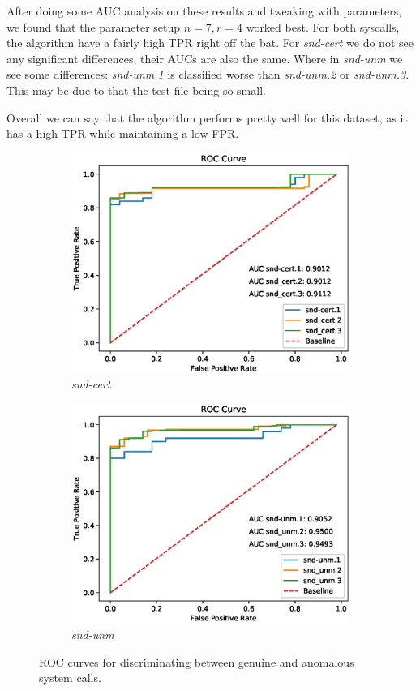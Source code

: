 \documentclass[11pt]{article}
\begin{document}
After doing some AUC analysis on these results and tweaking with parameters, we found that the parameter setup $n=7, r=4$ worked best. For both syscalls, the algorithm have a fairly high TPR right off the bat. For \textit{snd-cert} we do not see any significant differences, their AUCs are also the same. Where in \textit{snd-unm} we see some differences: \textit{snd-unm.1} is classified worse than \textit{snd-unm.2} or \textit{snd-unm.3}. This may be due to that the test file being so small.

Overall we can say that the algorithm performs pretty well for this dataset, as it has a high TPR while maintaining a low FPR.


\begin{figure}[H]
\centering
    \begin{subfigure}[b]{0.49\textwidth}
        \includegraphics[width=\textwidth]{images/roc_ex2_1.eps}
        \caption{\textit{snd-cert}}
        \label{fig:ROC_ex2_1}
    \end{subfigure}
    \begin{subfigure}[b]{0.49\textwidth}
        \includegraphics[width=\textwidth]{images/roc_ex2_2.eps}
        \caption{\textit{snd-unm}}
        \label{fig:ROC_ex2_2}
    \end{subfigure}
    \caption{ROC curves for discriminating between genuine and anomalous system calls.}
\end{figure}
\end{document}
